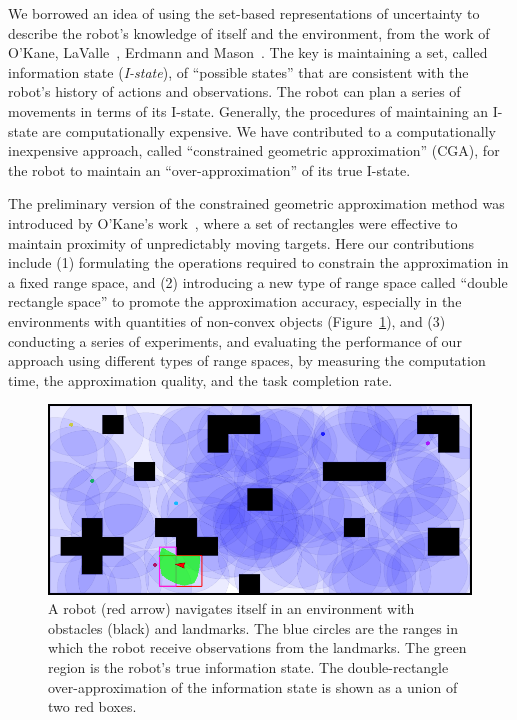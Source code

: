 We borrowed an idea of using the set-based representations of uncertainty to describe the robot's knowledge of
itself and the environment, from the work of O'Kane, LaValle~\cite{OKaLav08,Lav06}, Erdmann and Mason~\cite{ErdMas88}. The key is maintaining a set, called information state (\textit{I-state}), of ``possible states'' that are consistent with the robot's
history of actions and observations. The robot can plan a series of movements
in terms of its I-state. Generally, the procedures of maintaining an I-state are
computationally expensive. We have contributed to a computationally
inexpensive approach, called ``constrained geometric
approximation'' (CGA), for the robot to maintain an ``over-approximation'' of its true
I-state.

The preliminary version of the constrained geometric approximation method was
introduced by O'Kane's work~\cite{OKa11}, where a set of rectangles
were effective to maintain proximity of unpredictably moving targets. Here our 
contributions include (1) formulating the operations required to constrain the
approximation in a fixed range space, and (2) introducing a new type of range
space called ``double rectangle space'' to promote the approximation accuracy, especially in the environments with quantities of non-convex objects (Figure~\ref{fig:nav-clutter}), 
and (3) conducting a series of experiments, and evaluating the performance of
our approach using different types of range spaces, by measuring the computation time,
the approximation quality, and the task completion rate.

\begin{figure}
  \centering
  \includegraphics[width=.9\columnwidth]{figs/dbrect_clutter.png}
  \caption{A robot (red arrow) navigates itself in an environment with obstacles (black) and landmarks.
    The blue circles are the ranges in which the robot receive observations from the landmarks.
    The green region is the robot's true information state. The double-rectangle over-approximation
    of the information state is shown as a union of two red boxes.}
  \label{fig:nav-clutter}
\end{figure}


